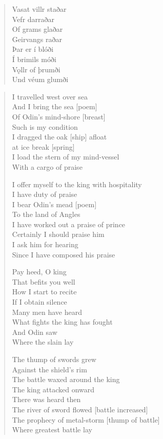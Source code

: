 \begin{paracol}{2}
\begin{quote}
        Vasat villr staðar\\
        Vefr darraðar\\
        Of grams glaðar\\
        Geirvangs raðar\\
        Þar er í blóði\\
        Í brimils móði\\
        Vǫllr of þrumði\\
        Und véum glumði
    \end{quote}
    \switchcolumn
    \begin{quote}
        I travelled west over sea\\
        And I bring the sea [poem]\\
        Of Odin's mind-shore [breast] \\
        Such is my condition\\
        I dragged the oak [ship] afloat\\
        at ice break [spring]\\
        I load the stern of my mind-vessel\\
        With a cargo of praise

        I offer myself to the king with hospitality\\
        I have duty of praise\\
        I bear Odin's mead [poem]\\
        To the land of Angles\\
        I have worked out a praise of prince\\
        Certainly I should praise him\\
        I ask him for hearing\\
        Since I have composed his praise

        Pay heed, O king\\
        That befits you well\\
        How I start to recite\\
        If I obtain silence\\
        Many men have heard \\
        What fights the king has fought\\
        And Odin saw\\
        Where the slain lay

        The thump of swords grew\\
        Against the shield's rim\\
        The battle waxed around the king\\
        The king attacked onward\\
        There was heard then\\
        The river of sword flowed [battle increased]\\
        The prophecy of metal-storm [thump of battle]\\
        Where greatest battle lay


\end{quote}
\end{paracol}
